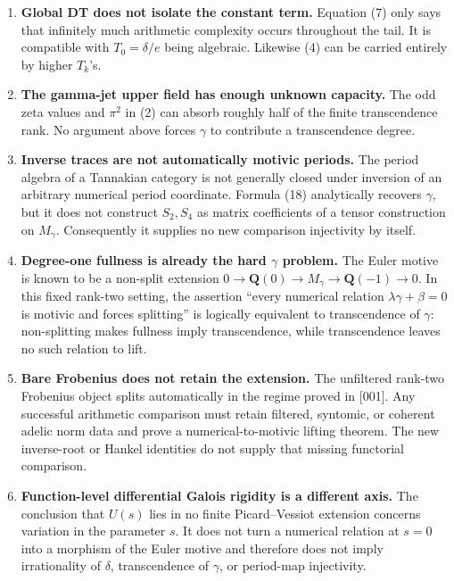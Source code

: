\begin{enumerate}
\def\labelenumi{\arabic{enumi}.}
\item
  \textbf{Global DT does not isolate the constant term.} Equation (7) only says
  that infinitely much arithmetic complexity occurs throughout the tail.
  It is compatible with \(T_0=\delta/e\) being algebraic. Likewise (4)
  can be carried entirely by higher \(T_k\)'s.
\item
  \textbf{The gamma-jet upper field has enough unknown capacity.} The odd
  zeta values and \(\pi^2\) in (2) can absorb roughly half of the finite
  transcendence rank. No argument above forces \(\gamma\) to contribute
  a transcendence degree.
\item
  \textbf{Inverse traces are not automatically motivic periods.} The period
  algebra of a Tannakian category is not generally closed under inversion
  of an arbitrary numerical period coordinate. Formula (18) analytically
  recovers \(\gamma\), but it does not construct \(S_2,S_4\) as matrix
  coefficients of a tensor construction on \(M_\gamma\). Consequently it
  supplies no new comparison injectivity by itself.
\item
  \textbf{Degree-one fullness is already the hard \(\gamma\) problem.} The
  Euler motive is known to be a non-split extension
  \(0\to\mathbf Q(0)\to M_\gamma\to\mathbf Q(-1)\to0\). In this fixed
  rank-two setting, the assertion ``every numerical relation
  \(\lambda\gamma+\beta=0\) is motivic and forces splitting'' is logically
  equivalent to transcendence of \(\gamma\): non-splitting makes fullness
  imply transcendence, while transcendence leaves no such relation to
  lift.
\item
  \textbf{Bare Frobenius does not retain the extension.} The unfiltered
  rank-two Frobenius object splits automatically in the regime proved in
  {[}001{]}. Any successful arithmetic comparison must retain filtered,
  syntomic, or coherent adelic norm data and prove a numerical-to-motivic
  lifting theorem. The new inverse-root or Hankel identities do not supply
  that missing functorial comparison.
\item
  \textbf{Function-level differential Galois rigidity is a different axis.}
  The conclusion that \(U(s)\) lies in no finite Picard--Vessiot extension
  concerns variation in the parameter \(s\). It does not turn a numerical
  relation at \(s=0\) into a morphism of the Euler motive and therefore does
  not imply irrationality of \(\delta\), transcendence of \(\gamma\), or
  period-map injectivity.
\end{enumerate}

